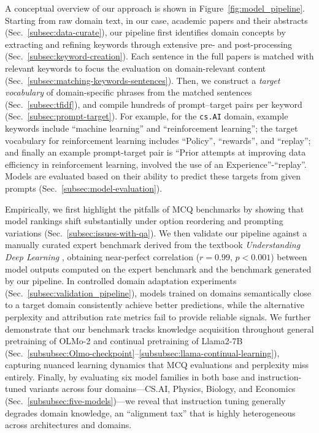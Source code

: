 \documentclass[10pt]{article}
\begin{document}
A conceptual overview of our approach is shown in Figure~\ref{fig:model_pipeline}. Starting from raw domain text, in our case, academic papers and their abstracts (Sec.~\ref{subsec:data-curate}), our pipeline first identifies domain concepts by extracting and refining keywords through extensive pre- and post-processing (Sec.~\ref{subsec:keyword-creation}). Each sentence in the full papers is matched with relevant keywords to focus the evaluation on domain-relevant content (Sec.~\ref{subsec:matching-keywords-sentences}). Then, we construct a \textit{target vocabulary} of domain-specific phrases from the matched sentences (Sec.~\ref{subsec:tfidf}), and compile hundreds of prompt–target pairs per keyword (Sec.~\ref{subsec:prompt-target}). For example, for the \texttt{cs.AI} domain, example keywords include ``machine learning'' and ``reinforcement learning''; the target vocabulary for reinforcement learning includes ``Policy'', ``rewards'', and ``replay''; and finally an example prompt-target pair is ``Prior attempts at improving data efficiency in reinforcement learning, involved the use of an Experience''-``replay''. Models are evaluated based on their ability to predict these targets from given prompts (Sec.~\ref{subsec:model-evaluation}).

Empirically, we first highlight the pitfalls of MCQ benchmarks by showing that model rankings shift substantially under option reordering and prompting variations (Sec.~\ref{subsec:issues-with-qa}). We then validate our pipeline against a manually curated expert benchmark derived from the textbook \emph{Understanding Deep Learning} \citep{prince2023understanding}, obtaining near-perfect correlation ($r{=}0.99$, $p{<}0.001$) between model outputs computed on the expert benchmark and the benchmark generated by our pipeline. In controlled domain adaptation experiments (Sec.~\ref{subsec:validation_pipeline}), models trained on domains semantically close to a target domain consistently achieve better predictions, while the alternative perplexity and attribution rate \citep{geva2023dissecting} metrics fail to provide reliable signals. We further demonstrate that our benchmark tracks knowledge acquisition throughout general pretraining of OLMo-2 \citep{olmo20242} and continual pretraining of Llama2-7B (Sec.~\ref{subsubsec:Olmo-checkpoint}--\ref{subsubsec:llama-continual-learning}), capturing nuanced learning dynamics that MCQ evaluations and perplexity miss entirely. Finally, by evaluating six model families in both base and instruction-tuned variants across four domains---CS.AI, Physics, Biology, and Economics (Sec.~\ref{subsubsec:five-models})---we reveal that instruction tuning generally degrades domain knowledge, an ``alignment tax'' that is highly heterogeneous across architectures and domains.
\end{document}
